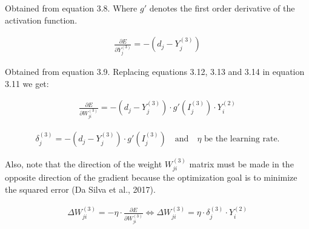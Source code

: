 \documentclass[
  12pt,
]{report}
\begin{document}
Obtained from equation 3.8. Where \(g'\) denotes the first order
derivative of the activation function.

\vspace{-1em}

\begin{equation}
\begin{aligned}
\frac{\partial E}{\partial Y_j^{(3)}} = -(d_j - Y_j^{(3)})
\label{eq:equation 3.14}
\end{aligned}
\end{equation} \vspace{-1em}

Obtained from equation 3.9. Replacing equations 3.12, 3.13 and 3.14 in
equation 3.11 we get:

\vspace{-1em}

\begin{equation}
\begin{aligned}
\frac{\partial E}{\partial W_{ji}^{(3)}} = -(d_j - Y_j^{(3)}) \cdot g'(I_j^{(3)}) \cdot Y_i^{(2)}
\label{eq:equation 3.15}
\end{aligned}
\end{equation} \vspace{-1em}

\vspace{-1em}

\begin{equation}
\begin{aligned}
\delta_j^{(3)} = -(d_j - Y_j^{(3)}) \cdot g'(I_j^{(3)}) \quad \text{and} \quad \eta \text{ be the learning rate.}
\label{eq:equation 3.16}
\end{aligned}
\end{equation} \vspace{-1em}

Also, note that the direction of the weight \(W_{ji}^{(3)}\) matrix must
be made in the opposite direction of the gradient because the
optimization goal is to minimize the squared error (Da Silva et al.,
2017).

\vspace{-1em}

\begin{equation}
\begin{aligned}
\Delta W_{ji}^{(3)} = -\eta \cdot \frac{\partial E}{\partial W_{ji}^{(3)}} \iff \Delta W_{ji}^{(3)} = \eta \cdot \delta_j^{(3)} \cdot Y_i^{(2)}
\label{eq:equation 3.17}
\end{aligned}
\end{equation} \vspace{-1em}
\end{document}
